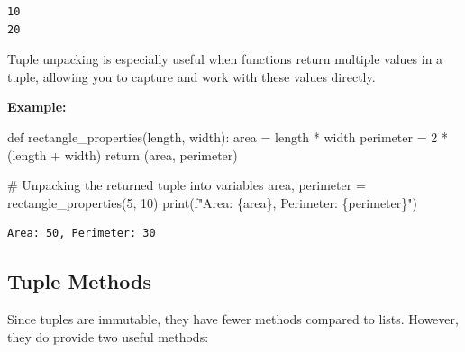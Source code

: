 \documentclass[
  letterpaper,
  DIV=11,
  numbers=noendperiod]{scrreprt}
\newenvironment{Shaded}{\begin{snugshade}}{\end{snugshade}}
\newcommand{\BuiltInTok}[1]{\textcolor[rgb]{0.00,0.23,0.31}{#1}}
\newcommand{\CommentTok}[1]{\textcolor[rgb]{0.37,0.37,0.37}{#1}}
\newcommand{\ControlFlowTok}[1]{\textcolor[rgb]{0.00,0.23,0.31}{#1}}
\newcommand{\DecValTok}[1]{\textcolor[rgb]{0.68,0.00,0.00}{#1}}
\newcommand{\KeywordTok}[1]{\textcolor[rgb]{0.00,0.23,0.31}{#1}}
\newcommand{\NormalTok}[1]{\textcolor[rgb]{0.00,0.23,0.31}{#1}}
\newcommand{\OperatorTok}[1]{\textcolor[rgb]{0.37,0.37,0.37}{#1}}
\newcommand{\SpecialCharTok}[1]{\textcolor[rgb]{0.37,0.37,0.37}{#1}}
\newcommand{\SpecialStringTok}[1]{\textcolor[rgb]{0.13,0.47,0.30}{#1}}
\begin{document}
\begin{verbatim}
10
20
\end{verbatim}

Tuple unpacking is especially useful when functions return multiple
values in a tuple, allowing you to capture and work with these values
directly.

\textbf{Example:}

\begin{Shaded}
\begin{Highlighting}[]
\KeywordTok{def}\NormalTok{ rectangle\_properties(length, width):}
\NormalTok{    area }\OperatorTok{=}\NormalTok{ length }\OperatorTok{*}\NormalTok{ width}
\NormalTok{    perimeter }\OperatorTok{=} \DecValTok{2} \OperatorTok{*}\NormalTok{ (length }\OperatorTok{+}\NormalTok{ width)}
    \ControlFlowTok{return}\NormalTok{ (area, perimeter)}

\CommentTok{\# Unpacking the returned tuple into variables}
\NormalTok{area, perimeter }\OperatorTok{=}\NormalTok{ rectangle\_properties(}\DecValTok{5}\NormalTok{, }\DecValTok{10}\NormalTok{)}
\BuiltInTok{print}\NormalTok{(}\SpecialStringTok{f"Area: }\SpecialCharTok{\{}\NormalTok{area}\SpecialCharTok{\}}\SpecialStringTok{, Perimeter: }\SpecialCharTok{\{}\NormalTok{perimeter}\SpecialCharTok{\}}\SpecialStringTok{"}\NormalTok{)}
\end{Highlighting}
\end{Shaded}

\begin{verbatim}
Area: 50, Perimeter: 30
\end{verbatim}

\hypertarget{tuple-methods}{%
\subsection{Tuple Methods}\label{tuple-methods}}

Since tuples are immutable, they have fewer methods compared to lists.
However, they do provide two useful methods:
\end{document}
